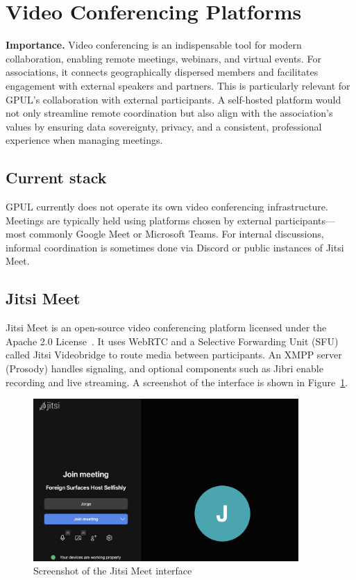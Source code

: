 \section{Video Conferencing Platforms}

\textbf{Importance.} Video conferencing is an indispensable tool for modern collaboration, enabling remote meetings, webinars, and virtual events. For associations, it connects geographically dispersed members and facilitates engagement with external speakers and partners. This is particularly relevant for GPUL's collaboration with external participants. A self-hosted platform would not only streamline remote coordination but also align with the association's values by ensuring data sovereignty, privacy, and a consistent, professional experience when managing meetings.

\subsection*{Current stack}

GPUL currently does not operate its own video conferencing infrastructure. Meetings are typically held using platforms chosen by external participants—most commonly Google Meet or Microsoft Teams. For internal discussions, informal coordination is sometimes done via Discord or public instances of Jitsi Meet.

\subsection*{Jitsi Meet}

Jitsi Meet is an open-source video conferencing platform licensed under the Apache 2.0 License~\cite{jitsi-docs}. It uses WebRTC and a Selective Forwarding Unit (SFU) called Jitsi Videobridge to route media between participants. An XMPP server (Prosody) handles signaling, and optional components such as Jibri enable recording and live streaming. A screenshot of the interface is shown in Figure~\ref{fig:jitsi-ui}.

\begin{figure}[h!]
  \centering
  \includegraphics[width=0.9\textwidth]{imaxes/jitsi-ui.png}
  \caption{Screenshot of the Jitsi Meet interface}
  \label{fig:jitsi-ui}
\end{figure}

